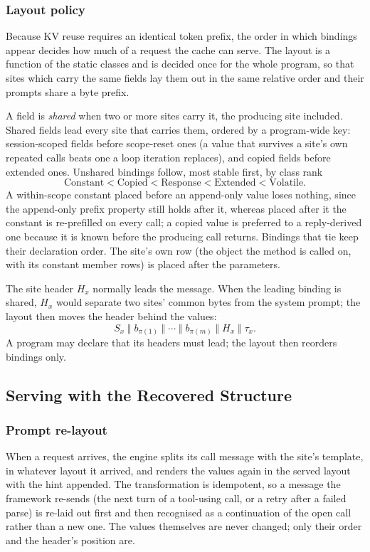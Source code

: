 \subsubsection{Layout policy}
\label{subsubsec:layout}
Because KV reuse requires an identical token prefix, the order in which bindings appear decides how much of a request the cache can serve. The layout is a function of the static classes and is decided once for the whole program, so that sites which carry the same fields lay them out in the same relative order and their prompts share a byte prefix.

A field is \emph{shared} when two or more sites carry it, the producing site included. Shared fields lead every site that carries them, ordered by a program-wide key: session-scoped fields before scope-reset ones (a value that survives a site's own repeated calls beats one a loop iteration replaces), and copied fields before extended ones. Unshared bindings follow, most stable first, by class rank
\[
\mathrm{Constant}<\mathrm{Copied}<\mathrm{Response}<\mathrm{Extended}<\mathrm{Volatile}.
\]
A within-scope constant placed before an append-only value loses nothing, since the append-only prefix property still holds after it, whereas placed after it the constant is re-prefilled on every call; a copied value is preferred to a reply-derived one because it is known before the producing call returns. Bindings that tie keep their declaration order. The site's own row (the object the method is called on, with its constant member rows) is placed after the parameters.

The site header $H_x$ normally leads the message. When the leading binding is shared, $H_x$ would separate two sites' common bytes from the system prompt; the layout then moves the header behind the values:
\[
S_x\;\Vert\;b_{\pi(1)}\;\Vert\;\cdots\;\Vert\;b_{\pi(m)}\;\Vert\;H_x\;\Vert\;\tau_x.
\]
A program may declare that its headers must lead; the layout then reorders bindings only.

\subsection{Serving with the Recovered Structure}

\subsubsection{Prompt re-layout}
When a request arrives, the engine splits its call message with the site's template, in whatever layout it arrived, and renders the values again in the served layout with the hint appended. The transformation is idempotent, so a message the framework re-sends (the next turn of a tool-using call, or a retry after a failed parse) is re-laid out first and then recognised as a continuation of the open call rather than a new one. The values themselves are never changed; only their order and the header's position are.

